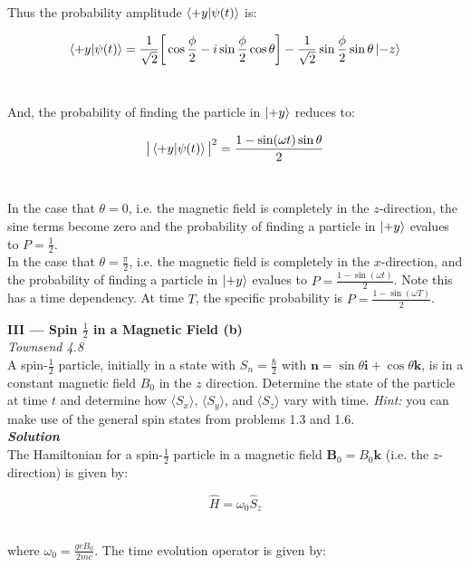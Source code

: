 \documentclass[9pt]{extarticle}
\renewcommand{\v}[1]{{\bm #1}}
\newcommand{\bfit}[1]{\textbf{\textit{#1}}}
\begin{document}
\begin{multicols*}{2}
Thus the probability amplitude $\bra{+y}\ket{\psi(t)}$ is:

$$\bra{+y}\ket{\psi(t)} = \frac{1}{\sqrt 2} \bigg[ \cos \frac \phi 2 - i\sin\frac \phi 2 \cos\theta \bigg] - \frac{1}{\sqrt 2} \sin\frac \phi 2 \sin\theta \ket{-z}$$ \ 

And, the probability of finding the particle in $\ket{+y}$ reduces to: 

$$\big| \bra{+y}\ket{\psi(t)} \big|^2 = \frac{1 - \sin(\omega t)\sin\theta}{2}$$ \ 

In the case that $\theta = 0$, i.e. the magnetic field is completely in the $z$-direction, the sine terms become zero and the probability of finding a particle in $\ket{+y}$ evalues to $P = \frac 12$. \\ 

In the case that $\theta = \frac \pi 2$, i.e. the magnetic field is completely in the $x$-direction, and the probability of finding a particle in $\ket{+y}$ evalues to $P = \frac{1 - \sin(\omega t)}{2}$. Note this has a time dependency. At time $T$, the specific probability is $P = \frac{1 - \sin(\omega T)}{2}$. \\  









\hrulefill 

\hfill

{\bf \LARGE III --- Spin $\frac 12$ in a Magnetic Field (b)} \\ 

{\it Townsend 4.8} \\ 
A spin-$\frac 12$ particle, initially in a state with $S_n = \frac \hbar 2$ with $\v n = \sin\theta \v i + \cos\theta \v k$, is in a constant magnetic field $B_0$ in the $z$ direction. Determine the state of the particle at time $t$ and determine how $\langle S_x \rangle$, $\langle S_y \rangle$, and $\langle S_z \rangle$ vary with time. {\it Hint:} you can make use of the general spin states from problems 1.3 and 1.6. \\ 

{\bfit{Solution}} \\ 
The Hamiltonian for a spin-$\frac 12$ particle in a magnetic field $\v B_0 = B_0 \v k$ (i.e. the $z$-direction) is given by:

$$\hat H = \omega_0 \hat S_z$$ \ 

where $\omega_0 = \frac{geB_0}{2mc}$. The time evolution operator is given by:


\end{multicols*}
\end{document}
